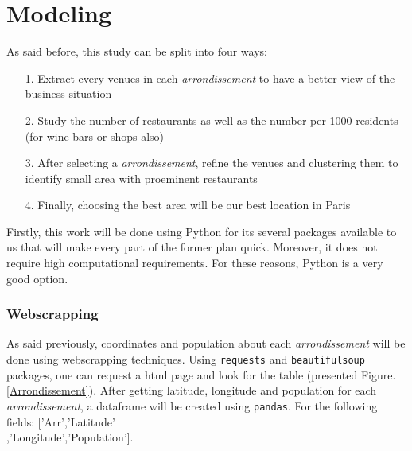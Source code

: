 \documentclass[english]{article}
\begin{document}
	\section{Modeling}
	As said before, this study can be split into four ways:
	\begin{itemize}
		\item[1.] Extract every venues in each \textit{arrondissement} to have a better view of the business situation
		\item[2.] Study the number of restaurants as well as the number per 1000 residents (for wine bars or shops also)
		\item[3.] After selecting a \textit{arrondissement}, refine the venues and clustering them to identify small area with proeminent restaurants
		\item[4.] Finally, choosing the best area will be our best location in Paris
	\end{itemize}
	Firstly, this work will be done using Python for its several packages available to us that will make every part of the former plan quick. Moreover, it does not require high computational requirements. For these reasons, Python is a very good option.
	\subsubsection{Webscrapping}
	As said previously, coordinates and population about each \textit{arrondissement} will be done using webscrapping techniques. Using \texttt{requests} and \texttt{beautifulsoup} packages, one can request a html page and look for the table (presented Figure.\ref{Arrondissement}). After getting latitude, longitude and population for each \textit{arrondissement}, a dataframe will be created using \texttt{pandas}. For the following fields: ['Arr','Latitude'\\,'Longitude','Population'].	
\end{document}

